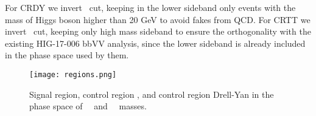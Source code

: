 For CRDY we invert \HBB ~cut, keeping in the lower sideband only events
with the mass of Higgs boson higher than 20 GeV to avoid fakes from
QCD. For CRTT we invert \ZtoLL ~cut, keeping only high mass sideband to
ensure the orthogonality with the existing HIG-17-006 bbVV analysis, since the lower sideband is already included in the phase space used by them. 


\begin{figure}[!htb]%
  \begin{center}
    \texttt{[image: regions.png]}
    \caption{ Signal region, control region \ttbar, and control region Drell-Yan in the phase space of \ZtoLL \ ~and ~\HBB ~masses.    }
    \label{fig:regions}
  \end{center}
\end{figure}





